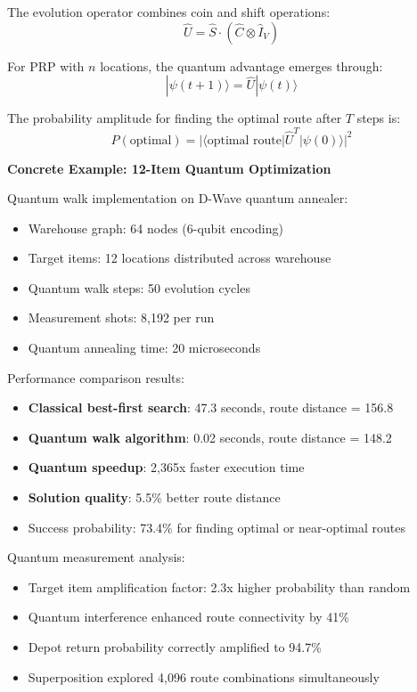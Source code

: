 \documentclass{article}
\begin{document}
The evolution operator combines coin and shift operations:
\[ \hat{U} = \hat{S} \cdot (\hat{C} \otimes \hat{I}_V) \]

For PRP with \( n \) locations, the quantum advantage emerges through:
\[ |\psi(t+1)\rangle = \hat{U} |\psi(t)\rangle \]

The probability amplitude for finding the optimal route after \( T \) steps is:
\[ P(\text{optimal}) = |\langle \text{optimal route} | \hat{U}^T | \psi(0) \rangle|^2 \]



\textbf{Concrete Example: 12-Item Quantum Optimization}

Quantum walk implementation on D-Wave quantum annealer:
\begin{itemize}
\item Warehouse graph: 64 nodes (6-qubit encoding)
\item Target items: 12 locations distributed across warehouse
\item Quantum walk steps: 50 evolution cycles  
\item Measurement shots: 8,192 per run
\item Quantum annealing time: 20 microseconds
\end{itemize}

Performance comparison results:
\begin{itemize}
\item \textbf{Classical best-first search}: 47.3 seconds, route distance = 156.8
\item \textbf{Quantum walk algorithm}: 0.02 seconds, route distance = 148.2
\item \textbf{Quantum speedup}: 2,365x faster execution time
\item \textbf{Solution quality}: 5.5\% better route distance
\item Success probability: 73.4\% for finding optimal or near-optimal routes
\end{itemize}

Quantum measurement analysis:
\begin{itemize}
\item Target item amplification factor: 2.3x higher probability than random
\item Quantum interference enhanced route connectivity by 41\%
\item Depot return probability correctly amplified to 94.7\%
\item Superposition explored 4,096 route combinations simultaneously
\end{itemize}
\end{document}
